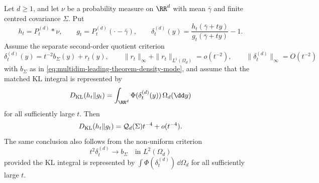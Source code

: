 \begin{theorem}%
\label{thm:second-order-quotient-kl-coefficient}
\label{prop:second-order-quotient-criterion}
Let \(d\ge1\), and let \(\nu\) be a probability measure on \(\RR^d\) with
mean \(\bar{\gamma}\) and finite centred covariance \(\Sigma\).  Put
\[
  h_t=P_t^{(d)}*\nu,\qquad
  g_t=P_t^{(d)}(\cdot-\bar{\gamma}),\qquad
  \delta_t^{(d)}(y)=\frac{h_t(\bar{\gamma}+ty)}
  {g_t(\bar{\gamma}+ty)}-1 .
\]
Assume the separate second-order quotient criterion
\begin{equation}\label{eq:second-order-quotient-criterion}
  \delta_t^{(d)}(y)=t^{-2}b_\Sigma(y)+r_t(y),\qquad
  \|r_t\|_\infty+\|r_t\|_{L^1(\Omega_d)}=o(t^{-2}),\qquad
  \|\delta_t^{(d)}\|_\infty=O(t^{-2})
\end{equation}
with \(b_\Sigma\) as in
\eqref{eq:multidim-leading-theorem-density-mode}, and assume that the matched
KL integral is represented by
\[
D_{\rm KL}(h_t\|g_t)
=\int_{\RR^d}\Phi(\delta_t^{(d)}(y))\,\Omega_d(\dd y)
\]
for all sufficiently large \(t\).  Then
\[
D_{\rm KL}(h_t\|g_t)=\mathcal Q_d(\Sigma)t^{-4}+o(t^{-4}).
\]
The same conclusion also follows from the non-uniform criterion
\[
  t^2\delta_t^{(d)}\to b_\Sigma\quad\text{in }L^2(\Omega_d)
\]
provided the KL integral is represented by
\(\int\Phi(\delta_t^{(d)})\,\dd\Omega_d\) for all sufficiently large \(t\).
\end{theorem}

